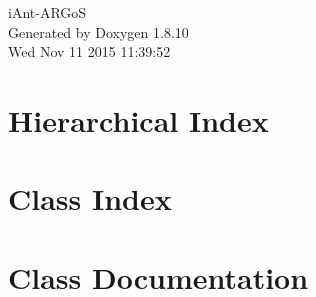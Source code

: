 \documentclass[twoside]{book}
\newcommand{\+}{\discretionary{\mbox{\scriptsize$\hookleftarrow$}}{}{}}
\newcommand{\clearemptydoublepage}{%
  \newpage{\pagestyle{empty}\cleardoublepage}%
}
\begin{document}
\hypersetup{pageanchor=false,
             bookmarks=true,
             bookmarksnumbered=true,
             pdfencoding=unicode
            }
\begin{titlepage}
\vspace*{7cm}
\begin{center}%
{\Large i\+Ant-\/\+A\+R\+Go\+S }\\
\vspace*{1cm}
{\large Generated by Doxygen 1.8.10}\\
\vspace*{0.5cm}
{\small Wed Nov 11 2015 11:39:52}\\
\end{center}
\end{titlepage}
\clearemptydoublepage
\tableofcontents
\clearemptydoublepage
{}
\hypersetup{pageanchor=true}

\chapter{Hierarchical Index}

\chapter{Class Index}

\chapter{Class Documentation}








\backmatter
\newpage
{}
\clearemptydoublepage
{}
\printindex
\end{document}
